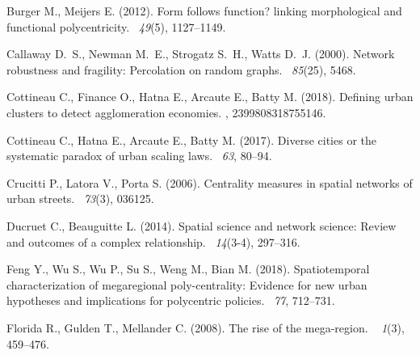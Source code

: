 \documentclass{jimis-en}
\begin{document}
\begin{thebibliography}{}
Burger M., Meijers E. (2012).
\newblock Form follows function? linking morphological and functional
  polycentricity.
~{\em 49\/}(5), 1127--1149.


Callaway D.~S., Newman M.~E., Strogatz S.~H., Watts D.~J. (2000).
\newblock Network robustness and fragility: Percolation on random graphs.
~{\em 85\/}(25), 5468.


Cottineau C., Finance O., Hatna E., Arcaute E., Batty M. (2018).
\newblock Defining urban clusters to detect agglomeration economies.
,
  2399808318755146.


Cottineau C., Hatna E., Arcaute E., Batty M. (2017).
\newblock Diverse cities or the systematic paradox of urban scaling laws.
~{\em 63}, 80--94.


Crucitti P., Latora V., Porta S. (2006).
\newblock Centrality measures in spatial networks of urban streets.
~{\em 73\/}(3), 036125.


Ducruet C., Beauguitte L. (2014).
\newblock Spatial science and network science: Review and outcomes of a complex
  relationship.
~{\em 14\/}(3-4), 297--316.


Feng Y., Wu S., Wu P., Su S., Weng M., Bian M. (2018).
\newblock Spatiotemporal characterization of megaregional poly-centrality:
  Evidence for new urban hypotheses and implications for polycentric policies.
~{\em 77}, 712--731.


Florida R., Gulden T., Mellander C. (2008).
\newblock The rise of the mega-region.
~{\em
  1\/}(3), 459--476.



\end{thebibliography}
\end{document}
